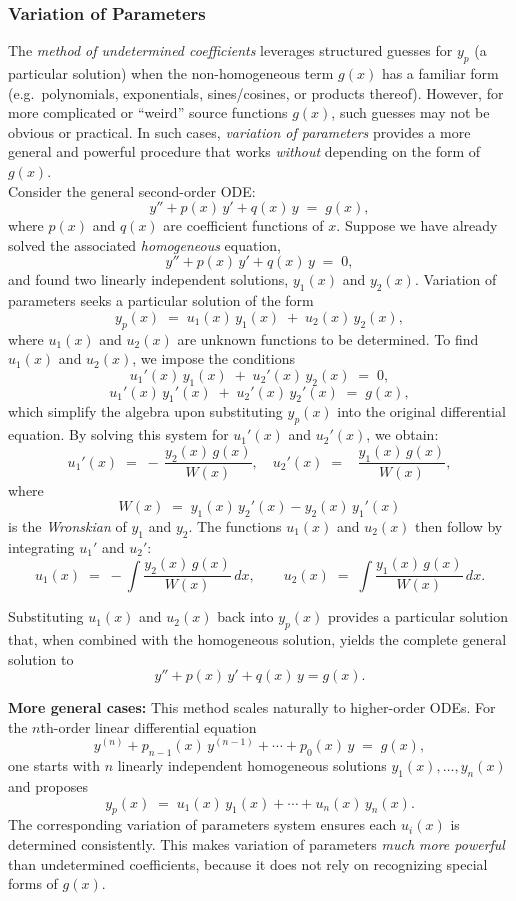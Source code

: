 \newpage
{} 

\subsubsection*{Variation of Parameters} 

\noindent
The \emph{method of undetermined coefficients} leverages structured guesses for $y_p$ (a particular solution) when the non-homogeneous term $g(x)$ has a familiar form (e.g.\ polynomials, exponentials, sines/cosines, or products thereof). However, for more complicated or ``weird'' source functions $g(x)$, such guesses may not be obvious or practical. In such cases, \emph{variation of parameters} provides a more general and powerful procedure that works \emph{without} depending on the form of $g(x)$. \\

\noindent
Consider the general second-order ODE:
\[
y'' + p(x)\,y' + q(x)\,y \;=\; g(x),
\]
where $p(x)$ and $q(x)$ are coefficient functions of $x$. Suppose we have already solved the associated \emph{homogeneous} equation,
\[
y'' + p(x)\,y' + q(x)\,y \;=\; 0,
\]
and found two linearly independent solutions, $y_1(x)$ and $y_2(x)$. Variation of parameters seeks a particular solution of the form
\[
y_p(x) \;=\; u_1(x)\,y_1(x) \;+\; u_2(x)\,y_2(x),
\]
where $u_1(x)$ and $u_2(x)$ are unknown functions to be determined. To find $u_1(x)$ and $u_2(x)$, we impose the conditions
\[
u_1'(x)\,y_1(x) \;+\; u_2'(x)\,y_2(x) \;=\; 0,
\]
\[
u_1'(x)\,y_1'(x) \;+\; u_2'(x)\,y_2'(x) \;=\; g(x),
\]
which simplify the algebra upon substituting $y_p(x)$ into the original differential equation. By solving this system for $u_1'(x)$ and $u_2'(x)$, we obtain:
\[
u_1'(x) \;=\; -\,\frac{y_2(x)\,g(x)}{W(x)},
\quad
u_2'(x) \;=\; \;\;\frac{y_1(x)\,g(x)}{W(x)},
\]
where
\[
W(x) \;=\; y_1(x)\,y_2'(x) - y_2(x)\,y_1'(x)
\]
is the \emph{Wronskian} of $y_1$ and $y_2$. The functions $u_1(x)$ and $u_2(x)$ then follow by integrating $u_1'$ and $u_2'$:
\[
u_1(x) \;=\; -\int \frac{y_2(x)\,g(x)}{W(x)}\,dx,
\qquad
u_2(x) \;=\; \int \frac{y_1(x)\,g(x)}{W(x)}\,dx.
\]

\noindent
Substituting $u_1(x)$ and $u_2(x)$ back into $y_p(x)$ provides a particular solution that, when combined with the homogeneous solution, yields the complete general solution to
\[
y'' + p(x)\,y' + q(x)\,y = g(x).
\]

\noindent
\textbf{More general cases:} This method scales naturally to higher-order ODEs. For the $n$th-order linear differential equation
\[
y^{(n)} + p_{n-1}(x)\,y^{(n-1)} + \cdots + p_0(x)\,y \;=\; g(x),
\]
one starts with $n$ linearly independent homogeneous solutions $y_1(x), \ldots, y_n(x)$ and proposes
\[
y_p(x) \;=\; u_1(x)\,y_1(x) + \cdots + u_n(x)\,y_n(x).
\]
The corresponding variation of parameters system ensures each $u_i(x)$ is determined consistently. This makes variation of parameters \emph{much more powerful} than undetermined coefficients, because it does not rely on recognizing special forms of $g(x)$. \\

